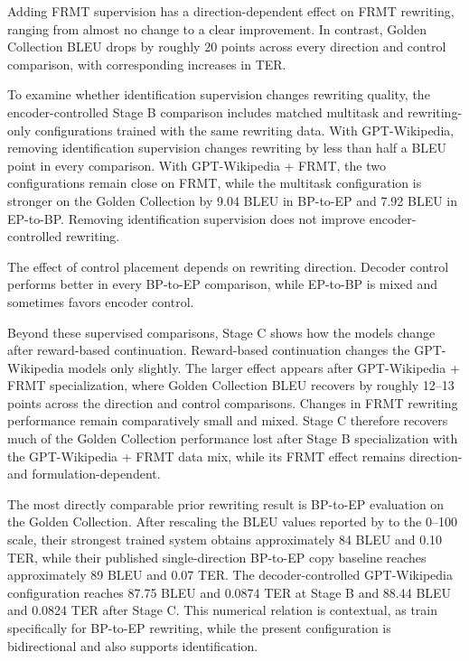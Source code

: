 Adding FRMT supervision has a direction-dependent effect on FRMT rewriting,
ranging from almost no change to a clear improvement. In contrast, Golden
Collection BLEU drops by roughly 20 points across every direction and control
comparison, with corresponding increases in TER.

To examine whether identification supervision changes rewriting quality, the
encoder-controlled Stage B comparison includes matched multitask and
rewriting-only configurations trained with the same rewriting data. With
GPT-Wikipedia, removing identification supervision changes rewriting by less
than half a BLEU point in every comparison. With GPT-Wikipedia + FRMT, the two
configurations remain close on FRMT, while the multitask configuration is
stronger on the Golden Collection by 9.04 BLEU in BP-to-EP and 7.92 BLEU in
EP-to-BP. Removing identification supervision does not improve
encoder-controlled rewriting.

The effect of control placement depends on rewriting direction. Decoder control
performs better in every BP-to-EP comparison, while EP-to-BP is mixed and
sometimes favors encoder control.

Beyond these supervised comparisons, Stage C shows how the models change after
reward-based continuation. Reward-based continuation changes the GPT-Wikipedia models only slightly. The
larger effect appears after GPT-Wikipedia + FRMT specialization, where Golden
Collection BLEU recovers by roughly 12--13 points across the direction and
control comparisons. Changes in FRMT rewriting performance remain comparatively
small and mixed. Stage C therefore recovers much of the Golden Collection
performance lost after Stage B specialization with the GPT-Wikipedia + FRMT data
mix, while its FRMT effect remains direction- and formulation-dependent.

The most directly comparable prior rewriting result is BP-to-EP evaluation on
the Golden Collection. After rescaling the BLEU values reported by
\citet{sanches2024brazilianportugueseeuropeanportuguese} to the 0--100 scale,
their strongest trained system obtains approximately 84 BLEU and 0.10 TER,
while their published single-direction BP-to-EP copy baseline reaches
approximately 89 BLEU and 0.07 TER. The decoder-controlled GPT-Wikipedia
configuration reaches 87.75 BLEU and 0.0874 TER at Stage B and 88.44 BLEU and
0.0824 TER after Stage C. This numerical relation is contextual, as
\citet{sanches2024brazilianportugueseeuropeanportuguese} train specifically for
BP-to-EP rewriting, while the present configuration is bidirectional and also
supports identification.

